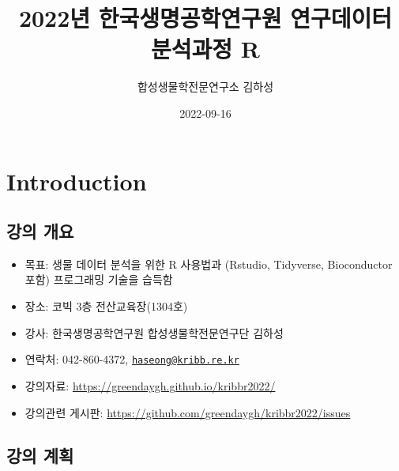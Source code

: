 \documentclass[
]{book}
\title{2022년 한국생명공학연구원 연구데이터 분석과정 R}
\author{합성생물학전문연구소 김하성}
\date{2022-09-16}
\providecommand{\tightlist}{%
  \setlength{\itemsep}{0pt}\setlength{\parskip}{0pt}}
\begin{document}
\maketitle

{
\setcounter{tocdepth}{1}
\tableofcontents
}
\hypertarget{introduction}{%
\chapter{Introduction}\label{introduction}}

\hypertarget{Information}{%
\section{강의 개요}\label{Information}}

\begin{itemize}
\tightlist
\item
  목표: 생물 데이터 분석을 위한 R 사용법과 (Rstudio, Tidyverse, Bioconductor 포함) 프로그래밍 기술을 습득함
\item
  장소: 코빅 3층 전산교육장(1304호)
\item
  강사: 한국생명공학연구원 합성생물학전문연구단 김하성
\item
  연락처: 042-860-4372, \href{mailto:haseong@kribb.re.kr}{\nolinkurl{haseong@kribb.re.kr}}
\item
  강의자료: \url{https://greendaygh.github.io/kribbr2022/}
\item
  강의관련 게시판: \url{https://github.com/greendaygh/kribbr2022/issues}
\end{itemize}

\hypertarget{Schedule}{%
\section{강의 계획}\label{Schedule}}
\end{document}
